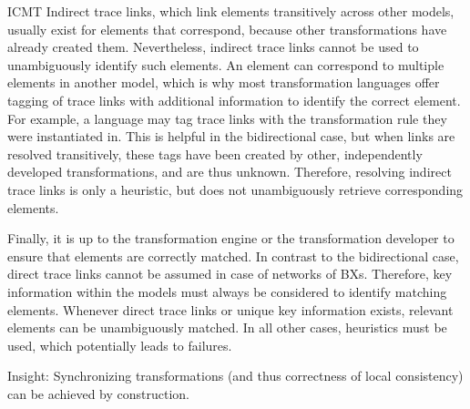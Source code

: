 \begin{copiedFrom}{ICMT}
Indirect trace links, which link elements transitively across other models, usually exist for elements that correspond, because other transformations have already created them.
Nevertheless, indirect trace links cannot be used to unambiguously identify such elements.
An element can correspond to multiple elements in another model, which is why most transformation languages offer tagging of trace links with additional information to identify the correct element.
For example, a language may tag trace links with the transformation rule they were instantiated in.
This is helpful in the bidirectional case, but when links are resolved transitively, these tags have been created by other, independently developed transformations, and are thus unknown.
Therefore, resolving indirect trace links is only a heuristic, but does not unambiguously retrieve corresponding elements.



Finally, it is up to the transformation engine or the transformation developer %
to ensure that elements are correctly matched.
In contrast to the bidirectional case, direct trace links cannot be assumed in case of networks of \acp{BX}.
Therefore, key information within the models must always be considered to identify matching elements.
Whenever direct trace links or unique key information exists, relevant elements can be unambiguously matched.
In all other cases, heuristics must be used, which potentially leads to failures.

\end{copiedFrom} %


Insight: Synchronizing transformations (and thus correctness of local consistency) can be achieved by construction.